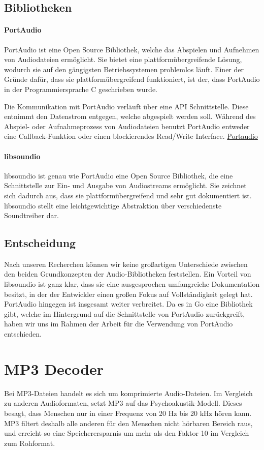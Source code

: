 \subsection{Bibliotheken}
\paragraph{PortAudio}
PortAudio ist eine Open Source Bibliothek, welche das Abspielen und Aufnehmen
von Audiodateien ermöglicht. Sie bietet eine plattformübergreifende Lösung,
wodurch sie auf den gängigsten Betriebssystemen problemlos läuft. Einer der
Gründe dafür, dass sie plattformübergreifend funktioniert, ist der, dass
PortAudio in der Programmiersprache C geschrieben wurde. \hfill \break

Die Kommunikation mit PortAudio verläuft über eine \ac{API} Schnittstelle.
Diese entnimmt den Datenstrom entgegen, welche abgespielt werden soll. Während
des Abspiel- oder Aufnahmeprozess von Audiodateien benutzt PortAudio entweder
eine Callback-Funktion oder einen blockierendes Read/Write Interface.
\href{http://www.portaudio.com/}{Portaudio}

\paragraph{libsoundio}
libsoundio ist genau wie PortAudio eine Open Source Bibliothek, die eine
Schnittstelle zur Ein- und Ausgabe von Audiostreams ermöglicht. Sie zeichnet
sich dadurch aus, dass sie plattformübergreifend und sehr gut dokumentiert ist.
libsoundio stellt eine leichtgewichtige Abstraktion über verschiedenste
Soundtreiber dar.

\subsection{Entscheidung}
Nach unseren Recherchen können wir keine großartigen Unterschiede zwischen den
beiden Grundkonzepten der Audio-Bibliotheken feststellen. Ein Vorteil von
libsoundio ist ganz klar, dass sie eine ausgesprochen umfangreiche
Dokumentation besitzt, in der der Entwickler einen großen Fokus auf
Vollständigkeit gelegt hat. PortAudio hingegen ist insgesamt weiter verbreitet.
Da es in Go eine Bibliothek gibt, welche im Hintergrund auf die Schnittstelle
von PortAudio zurückgreift, haben wir uns im Rahmen der Arbeit für die
Verwendung von PortAudio entschieden.

\section{MP3 Decoder}
Bei MP3-Dateien handelt es sich um komprimierte Audio-Dateien. Im Vergleich zu
anderen Audioformaten, setzt MP3 auf das Psychoakustik-Modell. Dieses besagt,
dass Menschen nur in einer Frequenz von 20 Hz bis 20 kHz hören kann. MP3
filtert deshalb alle anderen für den Menschen nicht hörbaren Bereich raus, und
erreicht so eine Speicherersparnis um mehr als den Faktor 10 im Vergleich zum
Rohformat. \hfill \break

